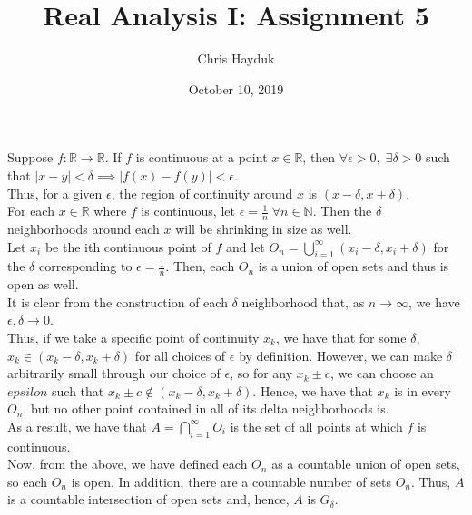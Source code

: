 \documentclass[12pt]{article}
\newenvironment{problem}[2][Problem]{\begin{trivlist}
\item[\hskip \labelsep {\bfseries #1}\hskip \labelsep {\bfseries #2.}]}{\end{trivlist}}
\begin{document}
\title{Real Analysis I: Assignment 5}

\author{Chris Hayduk}
\date{October 10, 2019}

\maketitle

\begin{problem}{1}
\end{problem}

Suppose $f: \mathbb{R} \to \mathbb{R}$. If $f$ is continuous at a point $x \in \mathbb{R}$, then $\forall \epsilon > 0, \; \exists \delta > 0$ such that $|x -y| < \delta \implies |f(x) - f(y)| < \epsilon$.\\

Thus, for a given $\epsilon$, the region of continuity around $x$ is $(x - \delta, x + \delta)$.\\

For each $x \in \mathbb{R}$ where $f$ is continuous, let $\epsilon = \frac{1}{n} \; \forall n \in \mathbb{N}$. Then the $\delta$ neighborhoods around each $x$ will be shrinking in size as well.\\

Let $x_i$ be the ith continuous point of $f$ and let $O_n = \bigcup\limits_{i=1}^{\infty} (x_i - \delta, x_i + \delta)$ for the $\delta$ corresponding to $\epsilon = \frac{1}{n}$. Then, each $O_n$ is a union of open sets and thus is open as well.\\

It is clear from the construction of each $\delta$ neighborhood that, as $n \to \infty$, we have $\epsilon, \delta \to 0$.\\

Thus, if we take a specific point of continuity $x_k$, we have that for some $\delta$, $x_k \in (x_k - \delta, x_k + \delta)$ for all choices of $\epsilon$ by definition. However, we can make $\delta$ arbitrarily small through our choice of $\epsilon$, so for any $x_k \pm c$, we can choose an $epsilon$ such that $x_k \pm c \not\in (x_k - \delta, x_k + \delta)$. Hence, we have that $x_k$ is in every $O_n$, but no other point contained in all of its delta neighborhoods is.\\

As a result, we have that $A = \bigcap\limits_{i=1}^{\infty} O_i$ is the set of all points at which $f$ is continuous.\\

Now, from the above, we have defined each $O_n$ as a countable union of open sets, so each $O_n$ is open. In addition, there are a countable number of sets $O_n$. Thus, $A$ is a countable intersection of open sets and, hence, $A$ is $G_{\delta}$.
\end{document}
